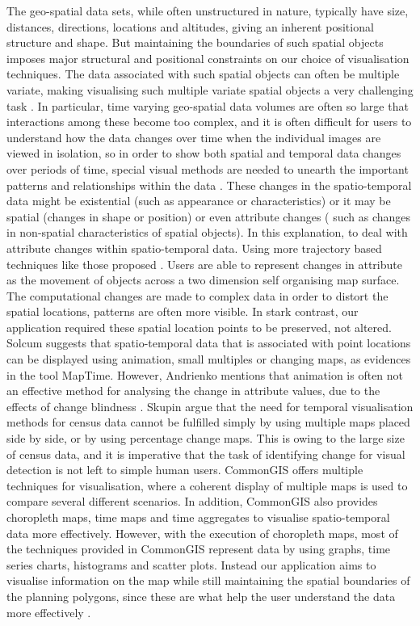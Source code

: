 The geo-spatial data sets, while often unstructured in nature, typically have size, distances, directions, locations and altitudes, giving an inherent positional structure and shape. But maintaining the boundaries of such spatial objects imposes major structural and positional constraints on our choice of visualisation techniques. The data associated with such spatial objects can often be multiple variate, making visualising such multiple variate spatial objects a very challenging task \cite{shneiderman1996eyes}. In particular, time varying geo-spatial data volumes are often so large that interactions among these become too complex, and it is often difficult for users to understand how the data changes over time when the individual images are viewed in isolation, so in order to show both spatial and temporal data changes over periods of time, special visual methods are needed to unearth the important patterns and relationships within the data \cite{maceachren2005visualizing}. These changes in the spatio-temporal data might be existential (such as appearance or characteristics) or it may be spatial (changes in shape or position) or even attribute changes ( such as changes in non-spatial characteristics of spatial objects). In this explanation, to deal with attribute changes within spatio-temporal data. Using more trajectory based techniques like those proposed \cite{skupin2000metaphor}. Users are able to represent changes in attribute as the movement of objects across a two dimension self organising map surface. The computational changes are made to complex data in order to distort the spatial locations, patterns are often more visible. In stark contrast, our application required these spatial location points to be preserved, not altered. Solcum \cite{slocum2001cognitive} suggests that spatio-temporal data that is associated with point locations can be displayed using animation, small multiples or changing maps, as evidences in the tool MapTime. However,  Andrienko mentions that animation is often not an effective method for analysing the change in attribute values, due to the effects of change blindness \cite{andrienko2003exploratory}. Skupin \cite{slocum2001cognitive} argue that the need for temporal visualisation methods for census data cannot be fulfilled simply by using multiple maps placed side by side, or by using percentage change maps. This is owing to the large size of census data, and it is imperative that the task of identifying change for visual detection is not left to simple human users. CommonGIS \cite{andrienko2002testing} offers multiple techniques for visualisation, where a coherent display of multiple maps is used to compare several different scenarios. In addition, CommonGIS also provides choropleth maps, time maps and time aggregates to visualise spatio-temporal data more effectively. However, with the execution of choropleth maps, most of the techniques provided in CommonGIS represent data by using graphs, time series charts, histograms and scatter plots. Instead our application aims to visualise information on the map while still maintaining the spatial boundaries of the planning polygons, since these are what help the user understand the data more effectively \cite{tahir2014geovisual}.

